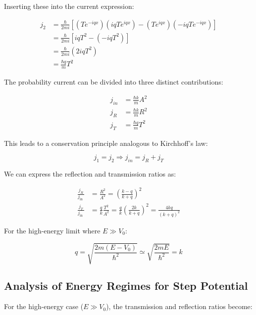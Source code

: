 \documentclass[italian]{HKNdocument}
\begin{document}
Inserting these into the current expression:

\begin{align}
j_{2} & =\frac{\hbar}{2 m i}\left[\left(T e^{-i q x}\right)\left(i q T e^{i q x}\right)-\left(T e^{i q x}\right)\left(-i q T e^{-i q x}\right)\right] \\
& =\frac{\hbar}{2 m i}\left[i q T^{2}-\left(-i q T^{2}\right)\right]  \label{eq:6.25}\\
& =\frac{\hbar}{2 m i}\left(2 i q T^{2}\right) \\
& =\frac{\hbar q}{m} T^{2}
\end{align}

The probability current can be divided into three distinct contributions:

\begin{align}
j_{i n} & =\frac{\hbar k}{m} A^{2} \\
j_{R} & =\frac{\hbar k}{m} R^{2}  \label{eq:6.26}\\
j_{T} & =\frac{\hbar q}{m} T^{2}
\end{align}

This leads to a conservation principle analogous to Kirchhoff's law:

\begin{equation}
j_{1}=j_{2} \Longrightarrow j_{i n}=j_{R}+j_{T} \label{eq:6.27}
\end{equation}

We can express the reflection and transmission ratios as:

\begin{align}
\frac{j_{R}}{j_{\text {in }}} & =\frac{R^{2}}{A^{2}}=\left(\frac{k-q}{k+q}\right)^{2} \\
\frac{j_{T}}{j_{\text {in }}} & =\frac{q}{k} \frac{T^{2}}{A^{2}}=\frac{q}{k}\left(\frac{2 k}{k+q}\right)^{2}=\frac{4 k q}{(k+q)^{2}} \label{eq:6.28}
\end{align}

For the high-energy limit where $E \gg V_{0}$:

\begin{equation}
q=\sqrt{\frac{2 m\left(E-V_{0}\right)}{\hbar^{2}}} \simeq \sqrt{\frac{2 m E}{\hbar^{2}}}=k \label{eq:6.29}
\end{equation}


\subsection{Analysis of Energy Regimes for Step Potential}

For the high-energy case ($E \gg V_{0}$), the transmission and reflection ratios become:
\end{document}
